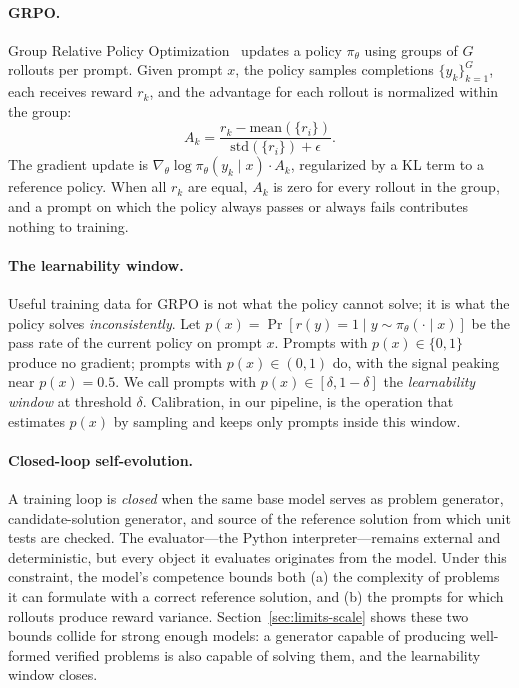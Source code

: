 \documentclass[11pt,a4paper]{article}
\begin{document}
\paragraph{GRPO.}
Group Relative Policy Optimization~\citep{shao2024grpo} updates a policy $\pi_\theta$ using groups of $G$ rollouts per prompt.
Given prompt $x$, the policy samples completions $\{y_k\}_{k=1}^G$, each receives reward $r_k$, and the advantage for each rollout is normalized within the group:
\begin{equation}
    A_k = \frac{r_k - \mathrm{mean}(\{r_i\})}{\mathrm{std}(\{r_i\}) + \epsilon}.
    \label{eq:grpo-adv}
\end{equation}
The gradient update is $\nabla_\theta \log \pi_\theta(y_k \mid x) \cdot A_k$, regularized by a KL term to a reference policy.
When all $r_k$ are equal, $A_k$ is zero for every rollout in the group, and a prompt on which the policy always passes or always fails contributes nothing to training.

\paragraph{The learnability window.}
Useful training data for GRPO is not what the policy cannot solve; it is what the policy solves \emph{inconsistently}.
Let $p(x) = \Pr[r(y) = 1 \mid y \sim \pi_\theta(\cdot \mid x)]$ be the pass rate of the current policy on prompt $x$.
Prompts with $p(x) \in \{0, 1\}$ produce no gradient; prompts with $p(x) \in (0, 1)$ do, with the signal peaking near $p(x) = 0.5$.
We call prompts with $p(x) \in [\delta, 1-\delta]$ the \emph{learnability window} at threshold $\delta$.
Calibration, in our pipeline, is the operation that estimates $p(x)$ by sampling and keeps only prompts inside this window.

\paragraph{Closed-loop self-evolution.}
A training loop is \emph{closed} when the same base model serves as problem generator, candidate-solution generator, and source of the reference solution from which unit tests are checked.
The evaluator---the Python interpreter---remains external and deterministic, but every object it evaluates originates from the model.
Under this constraint, the model's competence bounds both (a) the complexity of problems it can formulate with a correct reference solution, and (b) the prompts for which rollouts produce reward variance.
Section~\ref{sec:limits-scale} shows these two bounds collide for strong enough models: a generator capable of producing well-formed verified problems is also capable of solving them, and the learnability window closes.
\end{document}
